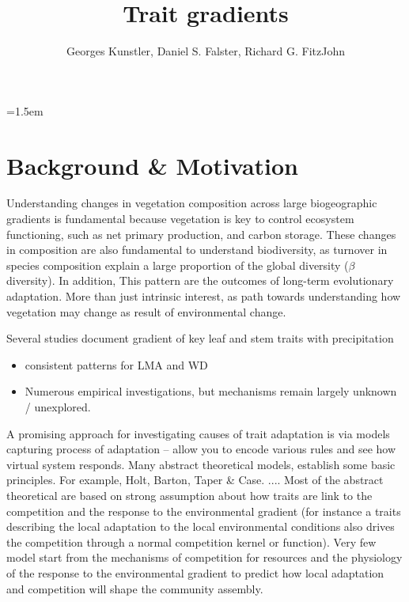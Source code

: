 \documentclass[a4paper,11pt]{article}
\title{Trait gradients}
\author{ Georges Kunstler, Daniel S. Falster, Richard G. FitzJohn}
\date{}
\affiliation{Department of Biological Sciences, Macquarie University,
  Sydney, Australia}
\begin{document}
\mstitleshort
\parindent=1.5em
\addtolength{\parskip}{.3em}


\section{Background \& Motivation}

Understanding changes in vegetation composition across large biogeographic gradients is fundamental because vegetation is key to control ecosystem functioning, such as net primary production, and carbon storage. These changes in composition are also fundamental to understand biodiversity, as turnover in species composition explain a large proportion of the global diversity ($\beta$ diversity). In addition,  This pattern are the outcomes of long-term evolutionary adaptation. More than just intrinsic interest, as path towards understanding how vegetation may change as result of environmental change.

Several studies document gradient of key leaf and stem traits with precipitation

\begin{itemize}
\item consistent patterns for LMA and WD
\item Numerous empirical investigations, but mechanisms remain largely unknown / unexplored.
\end{itemize}

A promising approach for investigating causes of trait adaptation is via models capturing process of adaptation -- allow you to encode various rules and see how virtual system responds. Many abstract theoretical models, establish some basic principles. For example, Holt, Barton, Taper \& Case. ....
Most of the abstract theoretical are based on strong assumption about how traits are link to the competition and the response to the environmental gradient (for instance a traits describing the local adaptation to the local environmental conditions also drives the competition through a normal competition kernel or function). Very few model start from the mechanisms of competition for resources and the physiology of the response to the environmental gradient to predict how local adaptation and competition will shape the community assembly.
\end{document}
